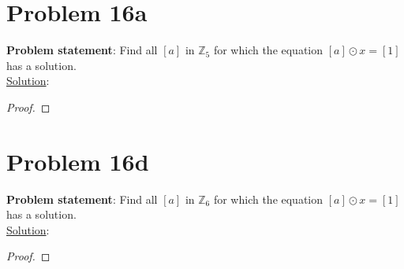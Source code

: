 \documentclass{article} %
\begin{document}
\newpage

\section*{Problem 16a}


\textbf{Problem statement}: Find all $[a]$ in $\mathbb{Z}_5$ for which the equation $[a] \odot x = [1]$ has a solution.
\\

\underline{Solution}: 
\begin{addmargin}[1em]{0em}
\begin{proof}

\end{proof}
\end{addmargin}

\newpage

\section*{Problem 16d}


\textbf{Problem statement}: Find all $[a]$ in $\mathbb{Z}_6$ for which the equation $[a] \odot x = [1]$ has a solution.
\\

\underline{Solution}: 
\begin{addmargin}[1em]{0em}
\begin{proof}

\end{proof}
\end{addmargin}

\end{document}
